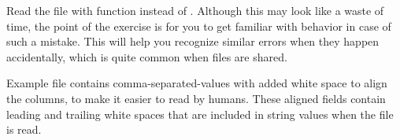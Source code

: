 \documentclass[krantz2]{krantz}\usepackage{knitr}
\begin{document}
\begin{knitrout}\footnotesize
{}\color{fgcolor}\begin{kframe}
\begin{alltt}
\end{alltt}


{\ttfamily\noindent\bfseries\color{errorcolor}{\#\# Error in lapply(X = X, FUN = FUN, ...): object 'from\_csv\_a.df' not found}}\begin{alltt}
\hlstd{from_csv_a.df[[}\hlstd{]]}
\end{alltt}


{\ttfamily\noindent\bfseries\color{errorcolor}{\#\# Error in eval(expr, envir, enclos): object 'from\_csv\_a.df' not found}}\begin{alltt}
\hlstd{(from_csv_a.df[[}\hlstd{]])}
\end{alltt}


{\ttfamily\noindent\bfseries\color{errorcolor}{\#\# Error in levels(from\_csv\_a.df[["{}col4"{}]]): object 'from\_csv\_a.df' not found}}\end{kframe}
\end{knitrout}

\begin{playground}
Read the file  with function  instead of . Although this may look like a waste of time, the point of the exercise is for you to get familiar with \Rlang behavior in case of such a mistake. This will help you recognize similar errors when they happen accidentally, which is quite common when files are shared.
\end{playground}

Example file  contains comma-separated-values with added white space to align the columns, to make it easier to read by humans. These aligned fields contain leading and trailing white spaces that are included in string values when the file is read.

\begin{knitrout}\footnotesize
{}\color{fgcolor}\begin{kframe}


{\ttfamily\noindent{}}

{\ttfamily\noindent\bfseries{}}\end{kframe}
\end{knitrout}
\end{document}
